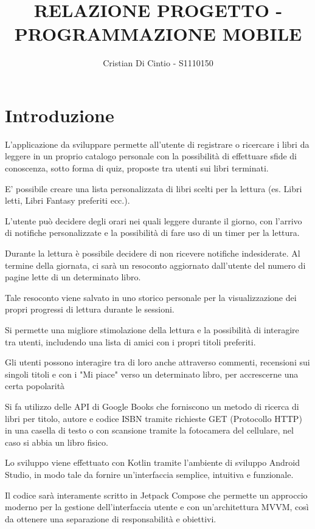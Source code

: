 \documentclass{article}
\author{Cristian Di Cintio - S1110150}
\title{RELAZIONE PROGETTO - PROGRAMMAZIONE MOBILE}
\begin{document}
\maketitle
\tableofcontents
\newpage

\section{Introduzione}

L'applicazione da sviluppare permette all'utente di registrare o ricercare i libri da leggere in un proprio catalogo personale con la possibilità di effettuare sfide di conoscenza, sotto forma di quiz, proposte tra utenti sui libri terminati.

E' possibile creare una lista personalizzata di libri scelti per la lettura (es. Libri letti, Libri Fantasy preferiti ecc.).

L'utente può decidere degli orari nei quali leggere durante il giorno, con l'arrivo di notifiche personalizzate e la possibilità di fare uso di un timer per la lettura. 

Durante la lettura è possibile decidere di non ricevere notifiche indesiderate. Al termine della giornata, ci sarà un resoconto aggiornato dall'utente del numero di pagine lette di un determinato libro.

Tale resoconto viene salvato in uno storico personale per la visualizzazione dei propri progressi di lettura durante le sessioni.

Si permette una migliore stimolazione della lettura e la possibilità di interagire tra utenti, includendo una lista di amici con i propri titoli preferiti.

Gli utenti possono interagire tra di loro anche attraverso commenti, recensioni sui singoli titoli e con i "Mi piace" verso un determinato libro, per accrescerne una certa popolarità

Si fa utilizzo delle API di Google Books che forniscono un metodo di ricerca di libri per titolo, autore e codice ISBN tramite richieste GET (Protocollo HTTP) in una casella di testo o con scansione tramite la fotocamera del cellulare, nel caso si abbia un libro fisico.

Lo sviluppo viene effettuato con Kotlin tramite l'ambiente di sviluppo Android Studio, in modo tale da fornire un'interfaccia semplice, intuitiva e funzionale.

Il codice sarà interamente scritto in Jetpack Compose che permette un approccio moderno per la gestione dell'interfaccia utente e con un'architettura MVVM, così da ottenere una separazione di responsabilità e obiettivi.
\end{document}
